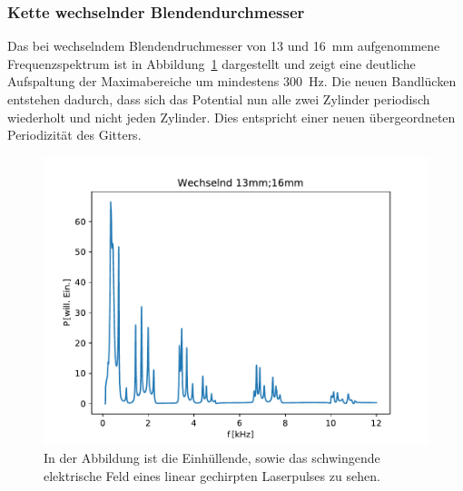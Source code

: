         \subsubsection*{Kette wechselnder Blendendurchmesser}
            Das bei wechselndem Blendendruchmesser von 13 und \SI{16}{\milli\metre} aufgenommene Frequenzspektrum ist in Abbildung~\ref{fig:1dim_8_Zylinder_blendewechselnd_13_16} dargestellt und zeigt eine 
            deutliche Aufspaltung der Maximabereiche um mindestens \SI{300}{\hertz}. Die neuen Bandlücken entstehen dadurch, dass sich das Potential nun alle zwei Zylinder periodisch wiederholt und nicht jeden 
            Zylinder. Dies entspricht einer neuen übergeordneten Periodizität des Gitters.  
            \begin{figure}[ht]
                \centering
                \includegraphics[scale=0.5]{./pictures/1dim_8_Zylinder_blendewechselnd_13_16.pdf}
                \caption{In der Abbildung ist die Einhüllende, sowie das schwingende elektrische Feld eines linear gechirpten Laserpulses zu sehen.}
                \label{fig:1dim_8_Zylinder_blendewechselnd_13_16}
            \end{figure}
            
            











































